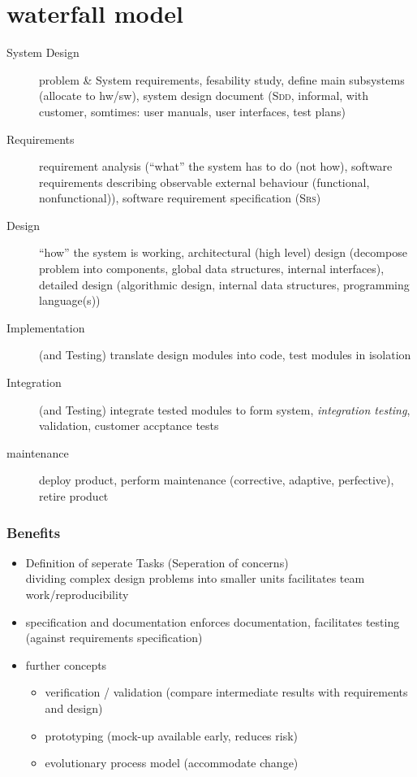 \documentclass[a4paper, 10pt]{article}
\begin{document}
\section*{waterfall model}


\begin{description}
	\item[System Design] problem \& System requirements, fesability study, define main subsystems (allocate to hw/sw), system design document (\textsc{Sdd}, informal, with customer, somtimes: user manuals, user interfaces, test plans)
	\item[Requirements] requirement analysis (``what'' the system has to do (not how), software requirements describing observable external behaviour (functional, nonfunctional)), software requirement specification (\textsc{Srs})
	\item[Design] ``how'' the system is working, architectural (high level) design (decompose problem into components, global data structures, internal interfaces), detailed design (algorithmic design, internal data structures, programming language(s))
	\item[Implementation] (and Testing) \follows translate design modules into code, test modules in isolation
	\item[Integration] (and Testing) integrate tested modules to form system, \emph{integration testing}, validation, customer accptance tests
	\item[maintenance] deploy product, perform maintenance (corrective, adaptive, perfective), retire product
\end{description}
\subsubsection*{Benefits}
\begin{itemize}
	\item Definition of seperate Tasks (Seperation of concerns)\\dividing complex design problems into smaller units \follows facilitates team work/reproducibility
	\item specification and documentation  \follows enforces documentation, facilitates testing (against requirements specification)
	\item further concepts
		\begin{itemize}
			\item verification / validation (compare intermediate results with requirements and design)
			\item prototyping (mock-up available early, reduces risk)
			\item evolutionary process model (accommodate change)
		\end{itemize}
\end{itemize}
\end{document}

